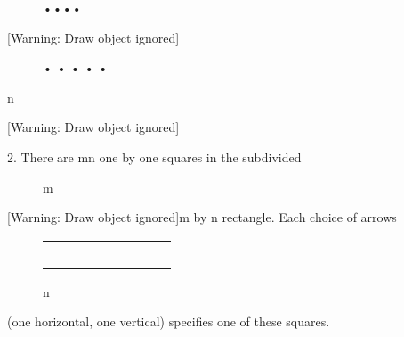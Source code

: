 \documentclass{article}
\begin{document}
\begin{figure}
\centering
\begin{minipage}{0.25in}
••••
\end{minipage}
\end{figure}
[Warning: Draw object ignored]

\begin{figure}
\centering
\begin{minipage}{1in}
•  •  •  •  •
\end{minipage}
\end{figure}
 n

[Warning: Draw object ignored]

2.  There are mn one by one squares in the subdivided  

\begin{figure}
\centering
\begin{minipage}{0.3752in}
m
\end{minipage}
\end{figure}
\begin{figure}
\centering
\begin{minipage}{0.3752in}
\end{minipage}
\end{figure}
\begin{figure}
\centering
\begin{minipage}{2.1252in}
\end{minipage}
\end{figure}
[Warning: Draw object ignored]m  by  n rectangle.  Each choice of arrows 

\begin{figure}
\centering
\begin{minipage}{2.5in}
\begin{flushleft}
\tablefirsthead{}
\tablehead{}
\tabletail{}
\tablelasttail{}
\begin{supertabular}{|m{0.09415985in}|m{0.094859846in}|m{0.094859846in}|m{0.094859846in}|m{0.094859846in}|m{0.094859846in}|m{0.094859846in}|m{0.094859846in}|m{0.094859846in}|}
\hline
 &
 &
 &
 &
 &
 &
 &
 &
\\\hline
 &
 &
 &
 &
 &
 &
 &
 &
\\\hline
 &
 &
 &
 &
 &
 &
 &
 &
\\\hline
 &
 &
 &
 &
 &
 &
 &
 &
\\\hline
 &
 &
 &
 &
 &
 &
 &
 &
\\\hline
 &
 &
 &
 &
 &
 &
 &
 &
\\\hline
\end{supertabular}
\end{flushleft}
 n
\end{minipage}
\end{figure}
(one horizontal, one vertical) specifies one of these squares.  
\end{document}

